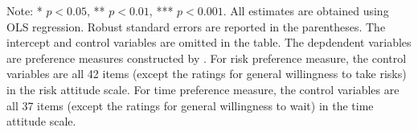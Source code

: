 \documentclass[12pt]{article}
\begin{document}
\begin{table}
    \vspace*{4pt}
    \centering
    \begin{minipage}{0.85\textwidth}
    {\par\footnotesize Note: * $p<0.05$, ** $p<0.01$, *** $p<0.001$. All estimates are obtained using OLS regression. Robust standard errors are reported in the parentheses. The intercept and control variables are omitted in the table. The depdendent variables are preference measures constructed by \cite{falk2023preference}. For risk preference measure, the control variables are all 42 items (except the ratings for general willingness to take risks) in the risk attitude scale. For time preference measure, the control variables are all 37 items  (except the ratings for general willingness to wait) in the time attitude scale.}
    \end{minipage}
    \label{tab:psm_incentive}
\end{table}
\end{document}
